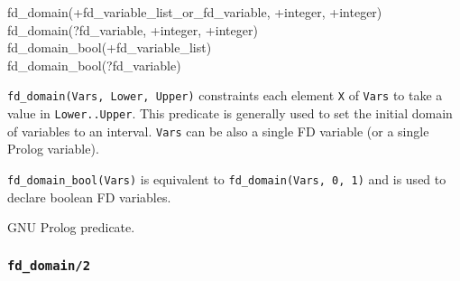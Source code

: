 \begin{TemplatesOneCol}
fd\_domain(+fd\_variable\_list\_or\_fd\_variable, +integer,
+integer)\\
fd\_domain(?fd\_variable, +integer, +integer)\\
fd\_domain\_bool(+fd\_variable\_list)\\
fd\_domain\_bool(?fd\_variable)

\end{TemplatesOneCol}

\Description

\texttt{fd\_domain(Vars, Lower, Upper)} constraints each element \texttt{X}
of \texttt{Vars} to take a value in \texttt{Lower..Upper}. This
predicate is generally used to set the initial domain of variables to an
interval. \texttt{Vars} can be also a single FD variable (or a single Prolog
variable).

\texttt{fd\_domain\_bool(Vars)} is equivalent to \texttt{fd\_domain(Vars, 0,
1)} and is used to declare boolean FD variables.

\begin{PlErrors}








\end{PlErrors}

\Portability

GNU Prolog predicate.

\subsubsection{\texttt{fd\_domain/2}}

